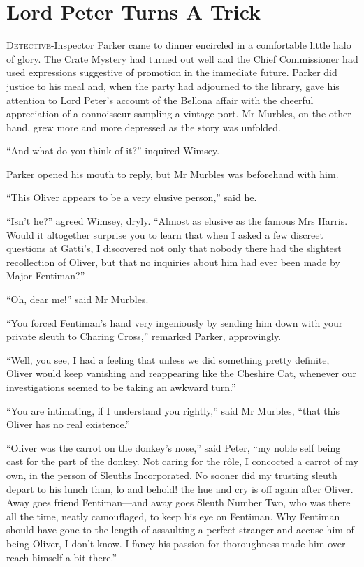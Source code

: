 \chapter{Lord Peter Turns A Trick}
\lettrine[lines=4]{D}{etective}-Inspector Parker came to dinner encircled in a comfortable little halo of glory. The Crate Mystery had turned out well and the Chief Commissioner had used expressions suggestive of promotion in the immediate future. Parker did justice to his meal and, when the party had adjourned to the library, gave his attention to Lord Peter's account of the Bellona affair with the cheerful appreciation of a connoisseur sampling a vintage port. Mr Murbles, on the other hand, grew more and more depressed as the story was unfolded.

\enquote{And what do you think of it?} inquired Wimsey.

Parker opened his mouth to reply, but Mr Murbles was beforehand with him.

\enquote{This Oliver appears to be a very elusive person,} said he.

\enquote{Isn't he?} agreed Wimsey, dryly. \enquote{Almost as elusive as the famous Mrs Harris. Would it altogether surprise you to learn that when I asked a few discreet questions at Gatti's, I discovered not only that nobody there had the slightest recollection of Oliver, but that no inquiries about him had ever been made by Major Fentiman?}

\enquote{Oh, dear me!} said Mr Murbles.

\enquote{You forced Fentiman's hand very ingeniously by sending him down with your private sleuth to Charing Cross,} remarked Parker, approvingly.

\enquote{Well, you see, I had a feeling that unless we did something pretty definite, Oliver would keep vanishing and reappearing like the Cheshire Cat, whenever our investigations seemed to be taking an awkward turn.}

\enquote{You are intimating, if I understand you rightly,} said Mr Murbles, \enquote{that this Oliver has no real existence.}

\enquote{Oliver was the carrot on the donkey's nose,} said Peter, \enquote{my noble self being cast for the part of the donkey. Not caring for the rôle, I concocted a carrot of my own, in the person of Sleuths Incorporated. No sooner did my trusting sleuth depart to his lunch than, lo and behold! the hue and cry is off again after Oliver. Away goes friend Fentiman\allowbreak---\allowbreak and away goes Sleuth Number Two, who was there all the time, neatly camouflaged, to keep his eye on Fentiman. Why Fentiman should have gone to the length of assaulting a perfect stranger and accuse him of being Oliver, I don't know. I fancy his passion for thoroughness made him over-reach himself a bit there.}

